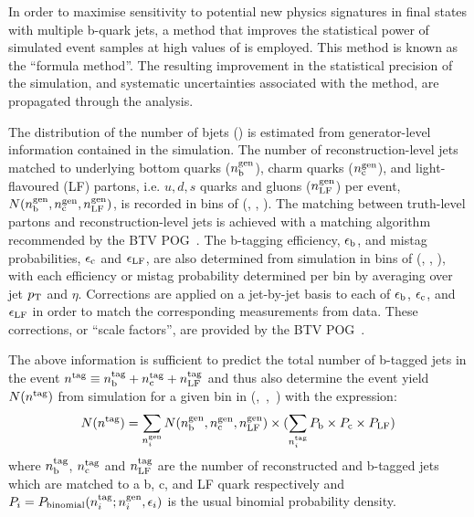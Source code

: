 In order to maximise sensitivity to potential new physics signatures
in final states with multiple b-quark jets, a method that improves the
statistical power of simulated event samples at high values of \nb is
employed. This method is known as the ``formula method''. The
resulting improvement in the statistical precision of the simulation,
and systematic uncertainties associated with the method, are
propagated through the analysis.

The distribution of the number of bjets (\nb) is estimated from
generator-level information contained in the simulation. The number of
reconstruction-level jets matched to underlying bottom quarks
($n_{\text{b}}^{\rm gen}$), charm quarks ($n_{\rm c}^{\rm gen}$), and
light-flavoured (LF) partons, i.e. $u,d,s$ quarks and gluons ($n_{\rm
  LF}^{\rm gen}$) per event, $N(n_{\text{b}}^{\rm gen},n_{\rm c}^{\rm
  gen},n_{\rm LF}^{\rm gen})$, is recorded in bins of (\njet ,
\scalht, \mht).  The matching between truth-level partons and
reconstruction-level jets is achieved with a matching algorithm
recommended by the BTV POG~\cite{btagMCTools}.  The b-tagging
efficiency, $\epsilon_{\rm b}$, and mistag probabilities,
$\epsilon_{\rm c}$ and $\epsilon_{\rm LF}$, are also determined from
simulation in bins of (\njet, \scalht, \mht), with each efficiency or
mistag probability determined per bin by averaging over jet $p_{\rm
  T}$ and $\eta$. Corrections are applied on a jet-by-jet basis to
each of $\epsilon_{\rm b}$, $\epsilon_{\rm c}$, and $\epsilon_{\rm
  LF}$ in order to match the corresponding measurements from
data. These corrections, or ``scale factors'', are provided by the BTV
POG~\cite{btagMCTools}.

The above information is sufficient to predict the total number of
b-tagged jets in the event $n^{\rm tag} \equiv n_{\rm b}^{\rm tag} +
n_{\rm c}^{\rm tag} + n_{\rm LF}^{\rm tag}$ and thus also determine the
event yield $N(n^{\rm tag})$ from simulation for a given bin in
(\njet,~\scalht,~\mht) with the expression:
\begin{equation}
  \label{equ:btag-formula}
  N(n^{\rm tag}) = \sum_{n_{i}^{\rm gen}} N(n_{\rm b}^{\rm gen},n_{\rm
    c}^{\rm gen},n_{\rm LF}^{\rm gen}) \times (\sum_{n_{i}^{\rm
      tag}}P_{\rm b}\times P_{\rm c} \times P_{\rm LF}) 
\end{equation}
where $n_{\rm b}^{\rm tag}$, $n_{\rm c}^{\rm tag}$ and $n_{\rm
  LF}^{\rm tag}$ are the number of reconstructed and b-tagged jets
which are matched to a b, c, and LF quark respectively and $P_{i} =
P_{\mathrm{binomial}}(n_{i}^{\rm tag}; n_{i}^{\rm gen}, \epsilon_{i})$
is the usual binomial probability density.

